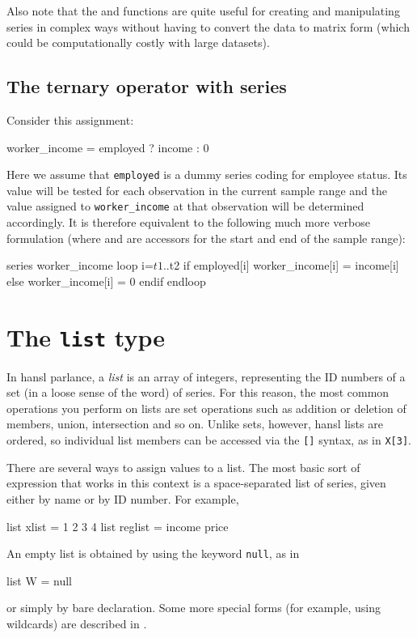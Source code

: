 Also note that the  and  functions are quite
useful for creating and manipulating series in complex ways without
having to convert the data to matrix form (which could be
computationally costly with large datasets).

\subsection{The ternary operator with series}

Consider this assignment:

\begin{code}
  worker_income = employed ? income : 0
\end{code}

Here we assume that \texttt{employed} is a dummy series coding for
employee status. Its value will be tested for each observation in the
current sample range and the value assigned to \texttt{worker\_income}
at that observation will be determined accordingly. It is therefore
equivalent to the following much more verbose formulation (where
 and  are accessors for the start and end of the
sample range):
\begin{code}
series worker_income
loop i=$t1..$t2
    if employed[i]
        worker_income[i] = income[i]
    else
        worker_income[i] = 0
    endif
endloop
\end{code}

\section{The \texttt{list} type}
\label{sec:lists}
 
In hansl parlance, a \textit{list} is an array of integers,
representing the ID numbers of a set (in a loose sense of the word) of
series.  For this reason, the most common operations you perform on
lists are set operations such as addition or deletion of members,
union, intersection and so on. Unlike sets, however, hansl lists are
ordered, so individual list members can be accessed via the
\texttt{[]} syntax, as in \texttt{X[3]}.

There are several ways to assign values to a list.  The most basic
sort of expression that works in this context is a space-separated
list of series, given either by name or by ID number.  For example,
\begin{code}
list xlist = 1 2 3 4
list reglist = income price 
\end{code}
An empty list is obtained by using the keyword \texttt{null}, as in
\begin{code}
list W = null  
\end{code}
or simply by bare declaration. Some more special forms (for example,
using wildcards) are described in \GUG.

